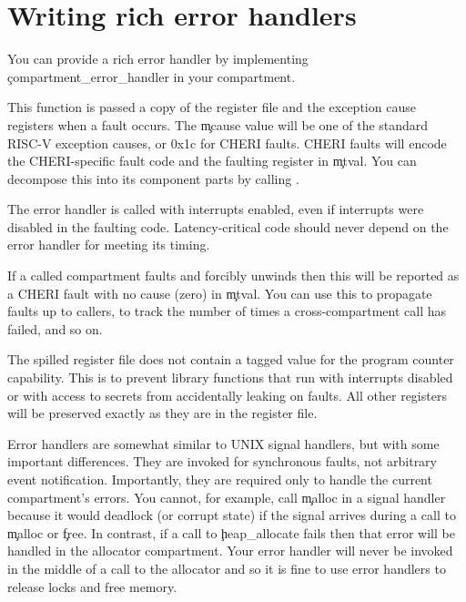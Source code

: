 \section{Writing rich error handlers}

You can provide a rich error handler by implementing \c{compartment_error_handler} in your compartment.


This function is passed a copy of the register file and the exception cause registers when a fault occurs.
The \c{mcause} value will be one of the standard RISC-V exception causes, or 0x1c for CHERI faults.
CHERI faults will encode the CHERI-specific fault code and the faulting register in \c{mtval}.
You can decompose this into its component parts by calling .


\begin{warning}
The error handler is called with interrupts enabled, even if interrupts were disabled in the faulting code.
Latency-critical code should never depend on the error handler for meeting its timing.
\end{warning}

If a called compartment faults and forcibly unwinds then this will be reported as a CHERI fault with no cause (zero) in \c{mtval}.
You can use this to propagate faults up to callers, to track the number of times a cross-compartment call has failed, and so on.

The spilled register file does not contain a tagged value for the program counter capability.
This is to prevent library functions that run with interrupts disabled or with access to secrets from accidentally leaking on faults.
All other registers will be preserved exactly as they are in the register file.

\begin{note}
Error handlers are somewhat similar to UNIX signal handlers, but with some important differences.
They are invoked for synchronous faults, not arbitrary event notification.
Importantly, they are required only to handle the current compartment's errors.
You cannot, for example, call \c{malloc} in a signal handler because it would deadlock (or corrupt state) if the signal arrives during a call to \c{malloc} or \c{free}.
In contrast, if a call to \c{heap_allocate} fails then that error will be handled in the allocator compartment.
Your error handler will never be invoked in the middle of a call to the allocator and so it is fine to use error handlers to release locks and free memory.
\end{note}

